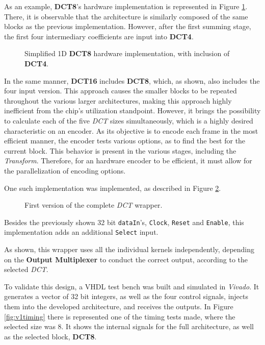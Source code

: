 As an example, \textbf{DCT8}'s hardware implementation is represented in Figure \ref{fig:harddct8v1}. There, it is observable that the architecture is similarly composed of the same blocks as the previous implementation. However, after the first summing stage, the first four intermediary coefficients are input into \textbf{DCT4}. 

\begin{figure}[!htbp]
    \centering
    
    \caption{Simplified 1D \textbf{DCT8} hardware implementation, with inclusion of \textbf{DCT4}.}
    \label{fig:harddct8v1}
\end{figure}

In the same manner, \textbf{DCT16} includes \textbf{DCT8}, which, as shown, also includes the four input version. This approach causes the smaller blocks to be repeated throughout the various larger architectures, making this approach highly inefficient from the chip's utilization standpoint. However, it brings the possibility to calculate each of the five \emph{DCT} sizes simultaneously, which is a highly desired characteristic on an encoder. As its objective is to encode each frame in the most efficient manner, the encoder tests various options, as to find the best for the current block. This behavior is present in the various stages, including the \emph{Transform}. Therefore, for an hardware encoder to be efficient, it must allow for the parallelization of encoding options.

One such implementation was implemented, as described in Figure \ref{fig:fullv1}.

\begin{figure}[!htbp]
    \centering
    
    \caption{First version of the complete \emph{DCT} wrapper.}
    \label{fig:fullv1}
\end{figure}

Besides the previously shown 32 bit \texttt{dataIn}'s, \texttt{Clock}, \texttt{Reset} and \texttt{Enable}, this implementation adds an additional \texttt{Select} input.

As shown, this wrapper uses all the individual kernels independently, depending on the \textbf{Output Multiplexer} to conduct the correct output, according to the selected \emph{DCT}.

To validate this design, a VHDL test bench was built and simulated in \emph{Vivado}. It generates a vector of 32 bit integers, as well as the four control signals, injects them into the developed architecture, and receives the outputs. In Figure \ref{fig:v1timing} there is represented one of the timing tests made, where the selected size was 8. It shows the internal signals for the full architecture, as well as the selected block, \textbf{DCT8}.

